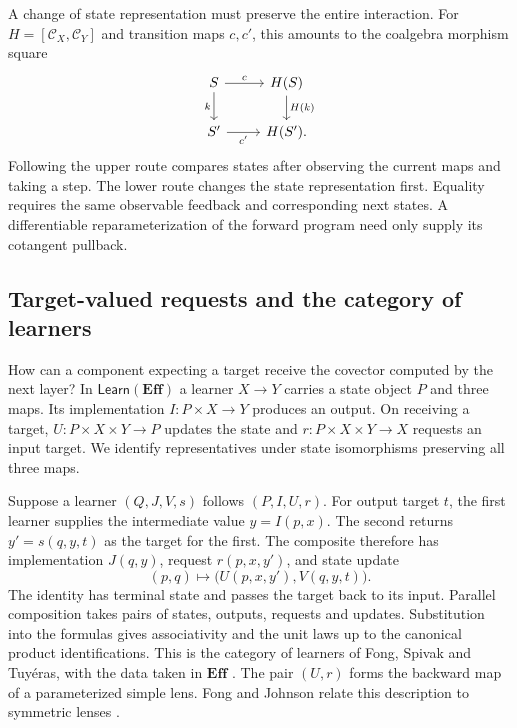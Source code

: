 \documentclass[11pt,a4paper]{article}
\theoremstyle{definition}
\theoremstyle{remark}\newaliascnt{remark}{theorem}
\newcommand{\E}{\mathbf{Eff}}
\numberwithin{equation}{section}
\begin{document}
A change of state representation must preserve the entire interaction. For $H=[\mathcal C_X,\mathcal C_Y]$ and transition maps $c,c'$, this amounts to the coalgebra morphism square
\[
\begin{tikzcd}
 S\arrow[r,"c"]\arrow[d,"k"']&H(S)\arrow[d,"H(k)"]\\
 S'\arrow[r,"c'"']&H(S').
\end{tikzcd}
\]
Following the upper route compares states after observing the current maps and taking a step. The lower route changes the state representation first. Equality requires the same observable feedback and corresponding next states. A differentiable reparameterization of the forward program need only supply its cotangent pullback.

\subsection{Target-valued requests and the category of learners}
How can a component expecting a target receive the covector computed by the next layer? In $\mathsf{Learn}(\E)$ a learner $X\to Y$ carries a state object $P$ and three maps. Its implementation $I:P\times X\to Y$ produces an output. On receiving a target, $U:P\times X\times Y\to P$ updates the state and $r:P\times X\times Y\to X$ requests an input target. We identify representatives under state isomorphisms preserving all three maps.

Suppose a learner $(Q,J,V,s)$ follows $(P,I,U,r)$. For output target $t$, the first learner supplies the intermediate value $y=I(p,x)$. The second returns $y'=s(q,y,t)$ as the target for the first. The composite therefore has implementation $J(q,y)$, request $r(p,x,y')$, and state update
\[
 (p,q)\longmapsto \big(U(p,x,y'),V(q,y,t)\big).
\]
The identity has terminal state and passes the target back to its input. Parallel composition takes pairs of states, outputs, requests and updates. Substitution into the formulas gives associativity and the unit laws up to the canonical product identifications. This is the category of learners of Fong, Spivak and Tuy\'eras, with the data taken in $\E$ \cite{neural:fong}. The pair $(U,r)$ forms the backward map of a parameterized simple lens. Fong and Johnson relate this description to symmetric lenses \cite{learn:johnson}.
\end{document}
